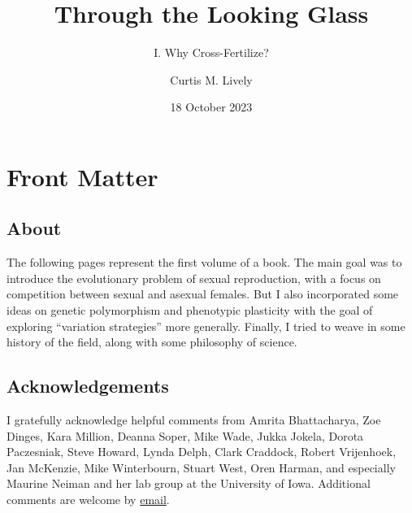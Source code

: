 \documentclass[
  letterpaper,
]{book}
\title{Through the Looking Glass}
\subtitle{I. Why Cross-Fertilize?}
\author{Curtis M. Lively}
\date{18 October 2023}
\renewcommand*\contentsname{Table of contents}
\newcommand\contentsname{Table of contents}
\begin{document}
\frontmatter
\maketitle
\ifdefined\Shaded\renewenvironment{Shaded}{\begin{tcolorbox}[breakable, enhanced, frame hidden, sharp corners, interior hidden, borderline west={3pt}{0pt}{shadecolor}, boxrule=0pt]}{\end{tcolorbox}}\fi

\renewcommand*\contentsname{Contents}
{
\hypersetup{linkcolor=}
\setcounter{tocdepth}{2}
\tableofcontents
}
\listoffigures
\listoftables
\mainmatter
{}

\hypertarget{front-matter}{%
\chapter*{Front Matter}\label{front-matter}}


\hypertarget{about}{%
\section*{About}\label{about}}


The following pages represent the first volume of a book. The main goal
was to introduce the evolutionary problem of sexual reproduction, with a
focus on competition between sexual and asexual females. But I also
incorporated some ideas on genetic polymorphism and phenotypic
plasticity with the goal of exploring ``variation strategies'' more
generally. Finally, I tried to weave in some history of the field, along
with some philosophy of science.

\hypertarget{acknowledgements}{%
\section*{Acknowledgements}\label{acknowledgements}}


I gratefully acknowledge helpful comments from Amrita Bhattacharya, Zoe
Dinges, Kara Million, Deanna Soper, Mike Wade, Jukka Jokela, Dorota
Paczesniak, Steve Howard, Lynda Delph, Clark Craddock, Robert
Vrijenhoek, Jan McKenzie, Mike Winterbourn, Stuart West, Oren Harman,
and especially Maurine Neiman and her lab group at the University of
Iowa. Additional comments are welcome by
\href{mailto:clively@indiana.edu}{email}.
\end{document}
